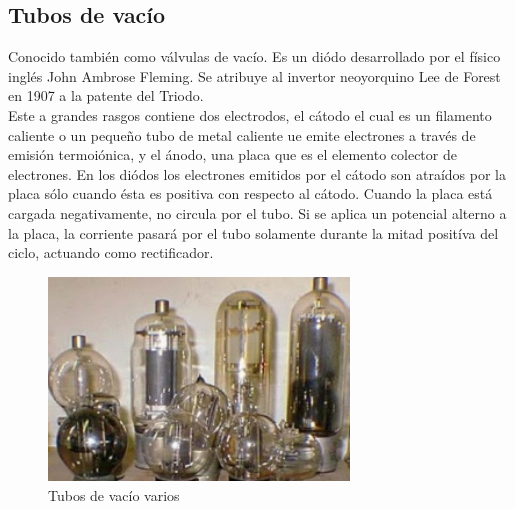 \documentclass[letterpaper, 12pt]{article}
\begin{document}
\begin{justify}
        \section{Tubos de vacío}
        Conocido también como válvulas de vacío. Es un diódo desarrollado por el físico inglés John Ambrose Fleming. Se atribuye al invertor neoyorquino Lee de Forest en 1907 a la patente del Triodo.
        \\
        Este a grandes rasgos contiene dos electrodos, el cátodo el cual es un filamento caliente o un pequeño tubo de metal caliente ue emite electrones a través de emisión termoiónica, y el ánodo, una placa que es el elemento colector de electrones. En los diódos
        los electrones emitidos por el cátodo son atraídos por la placa sólo cuando ésta es positiva con respecto al cátodo. Cuando la placa está cargada negativamente, no circula por el tubo. Si se aplica un potencial alterno a la placa, la corriente pasará por el 
        tubo solamente durante la mitad positíva del ciclo, actuando como rectificador.
        \begin{figure}[H]
            \centering
            \includegraphics[width=8cm]{tubitos.jpeg}
            \caption{Tubos de vacío varios}
            \label{fig:tubitos}
        \end{figure}


\end{justify}
\end{document}
